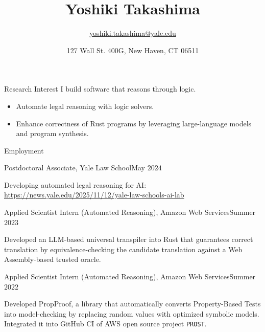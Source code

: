 \documentclass{resume} %
\title{\bf Yoshiki Takashima}
\author{\href{yoshiki.takashima@yale.edu}{yoshiki.takashima@yale.edu}}
\date{127 Wall St. 400G, New Haven, CT 06511}
\begin{document}
\maketitle

\begin{rSection}{Research Interest}
  I build software that reasons through logic.
  \begin{itemize}
  \item Automate legal reasoning with logic solvers.
  \item Enhance correctness of Rust programs by leveraging
    large-language models and program synthesis.
  \end{itemize}
\end{rSection}

\begin{rSection}{Employment}
  \begin{rSubsection}{Postdoctoral Associate, Yale Law School}{May $2024$} {}{}
  \item Developing automated legal reasoning for AI:
    \href{https://news.yale.edu/2025/11/12/yale-law-schools-ai-lab}{https://news.yale.edu/2025/11/12/yale-law-schools-ai-lab}
  \end{rSubsection}


  \begin{rSubsection}{Applied Scientist Intern (Automated Reasoning),
      Amazon Web Services}{Summer $2023$} {}{}
  \item Developed an LLM-based universal transpiler into Rust that
    guarantees correct translation by equivalence-checking the
    candidate translation against a Web Assembly-based trusted oracle.
  \end{rSubsection}

  \begin{rSubsection}{Applied Scientist Intern (Automated Reasoning),
      Amazon Web Services}{Summer $2022$} {}{}
  \item Developed PropProof, a library that automatically converts
    Property-Based Tests into model-checking by replacing
    random values with optimized symbolic models. Integrated it into
    GitHub CI of AWS open source project \texttt{PROST}.
  \end{rSubsection}
\end{rSection}
\end{document}

